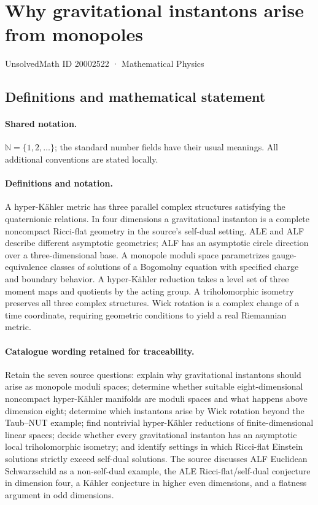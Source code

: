 \documentclass[11pt]{article}
\begin{document}
\setcounter{section}{20002521}
\section{Why gravitational instantons arise from monopoles}\label{20002522}
{\small UnsolvedMath ID 20002522 · Mathematical Physics}
\subsection{Definitions and mathematical statement}

\paragraph{Shared notation.}$\mathbb N=\{1,2,\ldots\}$; the standard number fields have their usual meanings. All additional conventions are stated locally.


\paragraph{Definitions and notation.}A hyper-Kähler metric has three parallel complex structures satisfying the quaternionic relations. In four dimensions a gravitational instanton is a complete noncompact Ricci-flat geometry in the source’s self-dual setting. ALE and ALF describe different asymptotic geometries; ALF has an asymptotic circle direction over a three-dimensional base. A monopole moduli space parametrizes gauge-equivalence classes of solutions of a Bogomolny equation with specified charge and boundary behavior. A hyper-Kähler reduction takes a level set of three moment maps and quotients by the acting group. A triholomorphic isometry preserves all three complex structures. Wick rotation is a complex change of a time coordinate, requiring geometric conditions to yield a real Riemannian metric.

\paragraph{Catalogue wording retained for traceability.}
Retain the seven source questions: explain why gravitational instantons should arise as monopole moduli spaces; determine whether suitable eight-dimensional noncompact hyper-Kähler manifolds are moduli spaces and what happens above dimension eight; determine which instantons arise by Wick rotation beyond the Taub--NUT example; find nontrivial hyper-Kähler reductions of finite-dimensional linear spaces; decide whether every gravitational instanton has an asymptotic local triholomorphic isometry; and identify settings in which Ricci-flat Einstein solutions strictly exceed self-dual solutions. The source discusses ALF Euclidean Schwarzschild as a non-self-dual example, the ALE Ricci-flat/self-dual conjecture in dimension four, a Kähler conjecture in higher even dimensions, and a flatness argument in odd dimensions.
\end{document}
